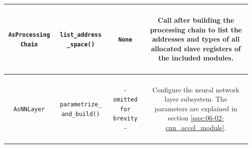 \begin{longtable}[htbp]{|c|c|c|c|}
\hline
\parbox{2.5cm}{~\\ \texttt{AsProcessing Chain}\\~} & \parbox{3cm}{~\\ \texttt{list\_address \_space()}\\~} & \parbox{3cm}{~ \\ \texttt{None} \\ ~} & \parbox{6cm}{~\\ Call after building the processing chain to list the addresses and types of all allocated slave registers of the included modules. \\~}\\
\hline



\parbox{2.5cm}{~\\ \texttt{AsNNLayer}\\~} & \parbox{3cm}{~\\ \texttt{parametrize\_ and\_build()}\\~} & \parbox{3cm}{~ \\ \texttt{- omitted for brevity -} \\ ~} & \parbox{6cm}{~\\ Configure the neural network layer subsystem. The parameters are explained in section \ref{ssec:06-02-cnn_accel_module}.  \\~}\\
\hline



\end{longtable}
